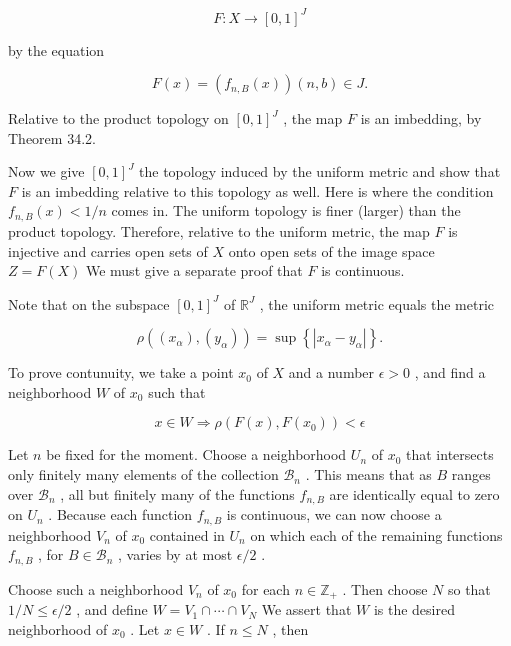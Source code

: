 \documentclass[10pt]{article}
\begin{document}
\[
F : X \rightarrow  {\left\lbrack  0,1\right\rbrack  }^{J}
\]

by the equation

\[
F\left( x\right)  = \left( {{f}_{n,B}\left( x\right) }\right) \left( {n,b}\right)  \in  J.
\]

Relative to the product topology on \({\left\lbrack  0,1\right\rbrack  }^{J}\) , the map \(F\) is an imbedding, by Theorem 34.2.

Now we give \({\left\lbrack  0,1\right\rbrack  }^{J}\) the topology induced by the uniform metric and show that \(F\) is an imbedding relative to this topology as well. Here is where the condition \({f}_{n,B}\left( x\right)  < 1/n\) comes in. The uniform topology is finer (larger) than the product topology. Therefore, relative to the uniform metric, the map \(F\) is injective and carries open sets of \(X\) onto open sets of the image space \(Z = F\left( X\right)\) We must give a separate proof that \(F\) is continuous.

Note that on the subspace \({\left\lbrack  0,1\right\rbrack  }^{J}\) of \({\mathbb{R}}^{J}\) , the uniform metric equals the metric

\[
\rho \left( {\left( {x}_{\alpha }\right) ,\left( {y}_{\alpha }\right) }\right)  = \sup \left\{  \left| {{x}_{\alpha } - {y}_{\alpha }}\right| \right\}  .
\]

To prove contunuity, we take a point \({x}_{0}\) of \(X\) and a number \(\epsilon  > 0\) , and find a neighborhood \(W\) of \({x}_{0}\) such that

\[
x \in  W \Rightarrow  \rho \left( {F\left( x\right) ,F\left( {x}_{0}\right) }\right)  < \epsilon
\]

Let \(n\) be fixed for the moment. Choose a neighborhood \({U}_{n}\) of \({x}_{0}\) that intersects only finitely many elements of the collection \({\mathcal{B}}_{n}\) . This means that as \(B\) ranges over \({\mathcal{B}}_{n}\) , all but finitely many of the functions \({f}_{n,B}\) are identically equal to zero on \({U}_{n}\) . Because each function \({f}_{n,B}\) is continuous, we can now choose a neighborhood \({V}_{n}\) of \({x}_{0}\) contained in \({U}_{n}\) on which each of the remaining functions \({f}_{n,B}\) , for \(B \in  {\mathcal{B}}_{n}\) , varies by at most \(\epsilon /2\) .

Choose such a neighborhood \({V}_{n}\) of \({x}_{0}\) for each \(n \in  {\mathbb{Z}}_{ + }\) . Then choose \(N\) so that \(1/N \leq  \epsilon /2\) , and define \(W = {V}_{1} \cap  \cdots  \cap  {V}_{N}\) We assert that \(W\) is the desired neighborhood of \({x}_{0}\) . Let \(x \in  W\) . If \(n \leq  N\) , then
\end{document}
